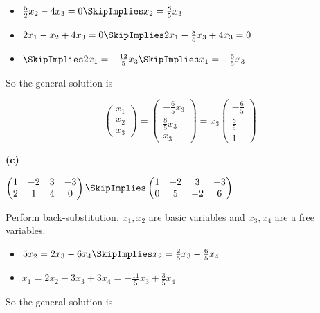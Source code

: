 \documentclass[oneside,12pt]{amsart}
\begin{document}
\begin{itemize}
\item $\frac{5}{2}x_2 -4x_3 = 0  \SkipImplies x_2 = \frac{8}{5} x_3$
\item $2 x_1 - x_2 +4 x_3 = 0 \SkipImplies 2x_1 - \frac{8}{5} x_3 + 4 x_3 =0$
\item $\SkipImplies 2x_1 = -\frac{12}{5} x_3 \SkipImplies x_1=-\frac{6}{5} x_3$
\end{itemize}

So the general solution is

$$
\begin{pmatrix}
 x_1 \\ x_2 \\ x_3
\end{pmatrix}
=
\begin{pmatrix}
 -\frac{6}{5} x_3  \\ \frac{8}{5} x_3 \\ x_3
\end{pmatrix}
=
x_3
\begin{pmatrix}
-\frac{6}{5}   \\ \frac{8}{5} \\ 1
\end{pmatrix}
$$


\bigskip

\textbf{(c)}

\bigskip

$
\begin{pmatrix}
1 & -2 & 3 & -3  \\
2 &  1 & 4 & 0
\end{pmatrix}
\SkipImplies
\begin{pmatrix}
1 & -2 &  3 & -3 \\
0 &  5 & -2 &  6
\end{pmatrix}
$

\bigskip

Perform back-substitution. $x_1,x_2$ are basic variables and $x_3,x_4$ are a
free variables.

\begin{itemize}
\item $5x_2=2x_3-6x_4  \SkipImplies x_2 = \frac{2}{5} x_3 - \frac{6}{5} x_4$
\item $x_1 =2x_2 -3x_3 +3x_4 =-\frac{11}{5} x_3 +\frac{3}{5} x_4$
\end{itemize}

So the general solution is
\end{document}
